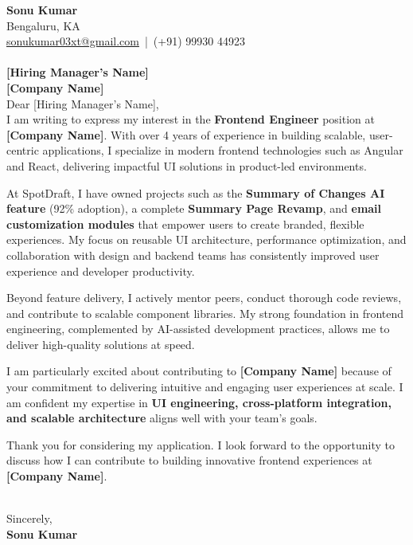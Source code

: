 \documentclass[a4paper,10pt]{article}
\begin{document}
\noindent
\textbf{Sonu Kumar} \\
Bengaluru, KA \\
\href{mailto:sonukumar03xt@gmail.com}{sonukumar03xt@gmail.com} \,|\, (+91) 99930 44923 \\[12pt]

\noindent
[Date] \\[6pt]

\noindent
\textbf{[Hiring Manager’s Name]} \\
\textbf{[Company Name]} \\[12pt]

Dear [Hiring Manager’s Name], \\[6pt]

I am writing to express my interest in the \textbf{Frontend Engineer} position at \textbf{[Company Name]}. With over 4 years of experience in building scalable, user-centric applications, I specialize in modern frontend technologies such as Angular and React, delivering impactful UI solutions in product-led environments.

At SpotDraft, I have owned projects such as the \textbf{Summary of Changes AI feature} (92\% adoption), a complete \textbf{Summary Page Revamp}, and \textbf{email customization modules} that empower users to create branded, flexible experiences. My focus on reusable UI architecture, performance optimization, and collaboration with design and backend teams has consistently improved user experience and developer productivity.

Beyond feature delivery, I actively mentor peers, conduct thorough code reviews, and contribute to scalable component libraries. My strong foundation in frontend engineering, complemented by AI-assisted development practices, allows me to deliver high-quality solutions at speed.

I am particularly excited about contributing to \textbf{[Company Name]} because of your commitment to delivering intuitive and engaging user experiences at scale. I am confident my expertise in \textbf{UI engineering, cross-platform integration, and scalable architecture} aligns well with your team’s goals.

Thank you for considering my application. I look forward to the opportunity to discuss how I can contribute to building innovative frontend experiences at \textbf{[Company Name]}.

\\[12pt]
Sincerely, \\
\textbf{Sonu Kumar}
\end{document}
